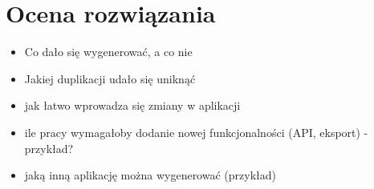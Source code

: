 \chapter{Ocena rozwiązania} \label{chap:evaluation}

\begin{itemize}
 \item Co dało się wygenerować, a co nie
 \item Jakiej duplikacji udało się uniknąć
 \item jak łatwo wprowadza się zmiany w aplikacji
 \item ile pracy wymagałoby dodanie nowej funkcjonalności (API, eksport) - przykład?
 \item jaką inną aplikację można wygenerować (przykład)
\end{itemize}